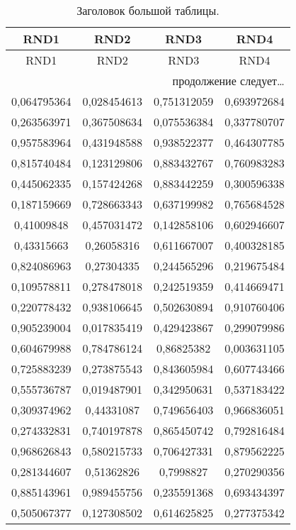 \documentclass[a4paper,14pt]{extarticle}
\begin{document}
\begin{longtable}{|c|c|c|c|}
	\caption{Заголовок большой таблицы.}\\
	\hline
	\textbf{RND1} & \textbf{RND2} & \textbf{RND3} & \textbf{RND4} \\ \hline
	\endfirsthead
	\hline
	RND1 & RND2 & RND3 & RND4 \\ \hline
	\endhead
	\hline
	\multicolumn{4}{r}{продолжение следует\ldots} \
	\endfoot
	\hline
	\endlastfoot
	
	0,576745371 & 0,435853468 & 0,36384912 & 0,299047979 \\ 
	0,064795364 & 0,028454613 & 0,751312059 & 0,693972684 \\
	0,263563971 & 0,367508634 & 0,075536384 & 0,337780707 \\
	0,957583964 & 0,431948588 & 0,938522377 & 0,464307785 \\
	0,815740484 & 0,123129806 & 0,883432767 & 0,760983283 \\
	0,445062335 & 0,157424268 & 0,883442259 & 0,300596338 \\
	0,187159669 & 0,728663343 & 0,637199982 & 0,765684528 \\
	0,41009848 & 0,457031472 & 0,142858106 & 0,602946607 \\
	0,43315663 & 0,26058316 & 0,611667007 & 0,400328185 \\
	0,824086963 & 0,27304335 & 0,244565296 & 0,219675484 \\
	0,109578811 & 0,278478018 & 0,242519359 & 0,414669471 \\
	0,220778432 & 0,938106645 & 0,502630894 & 0,910760406 \\
	0,905239004 & 0,017835419 & 0,429423867 & 0,299079986 \\
	0,604679988 & 0,784786124 & 0,86825382 & 0,003631105 \\
	0,725883239 & 0,273875543 & 0,843605984 & 0,607743466 \\
	0,555736787 & 0,019487901 & 0,342950631 & 0,537183422 \\
	0,309374962 & 0,44331087 & 0,749656403 & 0,966836051 \\
	0,274332831 & 0,740197878 & 0,865450742 & 0,792816484 \\
	0,968626843 & 0,580215733 & 0,706427331 & 0,879562225 \\
	0,281344607 & 0,51362826 & 0,7998827 & 0,270290356 \\
	0,885143961 & 0,989455756 & 0,235591368 & 0,693434397 \\
	0,505067377 & 0,127308502 & 0,614625825 & 0,277375342 \\

\end{longtable}
\end{document}
